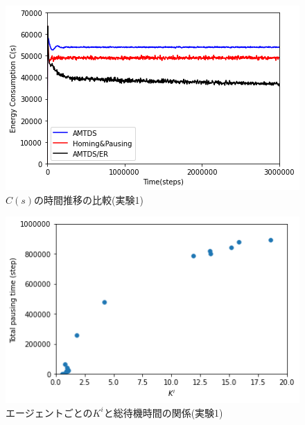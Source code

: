 \documentclass[12pt,a4j,twoside]{jarticle}
\begin{document}
  \begin{figure}
    \centering
    \includegraphics[width=150mm]{figures/cs_graph_3600_ave_ER_Office_600.png}
    \caption{$C(s)$の時間推移の比較(実験1)}
    \label{fig:cs_ER_Office}
  \end{figure}

  \begin{figure}
    \centering
    \includegraphics[width=150mm]{figures/CorrectionScatter_Office_ER.png}
    \caption{エージェントごとの$K^i$と総待機時間の関係(実験1)}
    \label{fig:cscatter_ER_Office}
  \end{figure}
\end{document}
